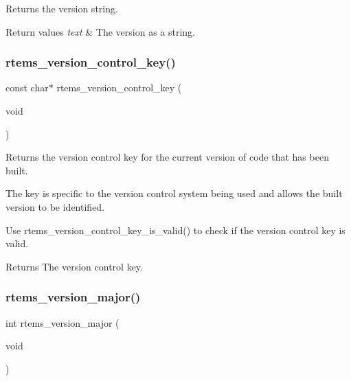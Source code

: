 Returns the version string. 


\begin{DoxyRetVals}{Return values}
{\em text} & The version as a string. \\
\hline
\end{DoxyRetVals}
\mbox{\label{group__RTEMSAPIClassicVersion_ga77f6606b59bca0909f665e6280ee5b2f}} 
\subsubsection{\texorpdfstring{rtems\_version\_control\_key()}{rtems\_version\_control\_key()}}
{\footnotesize\ttfamily const char$\ast$ rtems\+\_\+version\+\_\+control\+\_\+key (\begin{DoxyParamCaption}\item[{void}]{ }\end{DoxyParamCaption})}



Returns the version control key for the current version of code that has been built. 

The key is specific to the version control system being used and allows the built version to be identified.

Use rtems\+\_\+version\+\_\+control\+\_\+key\+\_\+is\+\_\+valid() to check if the version control key is valid.

\begin{DoxyReturn}{Returns}
The version control key. 
\end{DoxyReturn}
\mbox{\label{group__RTEMSAPIClassicVersion_ga076be33a4a45e0805019c4f0282a605f}} 
\subsubsection{\texorpdfstring{rtems\_version\_major()}{rtems\_version\_major()}}
{\footnotesize\ttfamily int rtems\+\_\+version\+\_\+major (\begin{DoxyParamCaption}\item[{void}]{ }\end{DoxyParamCaption})}



